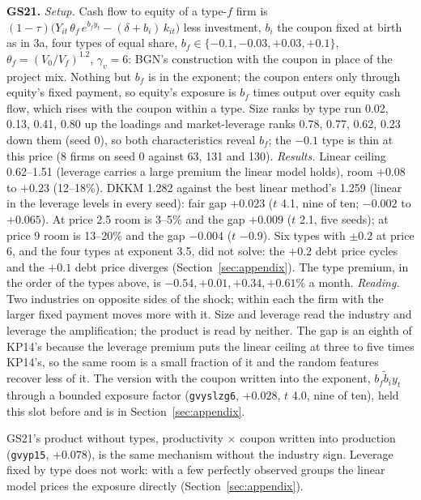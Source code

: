 \documentclass[11pt]{article}
\begin{document}
\noindent\textbf{GS21.} \emph{Setup.} Cash flow to equity of a type-$f$ firm is $(1-\tau)\big(Y_{it}\,\theta_f\,e^{b_f y_t} - (\delta + b_i)\,k_{it}\big)$ less investment, $b_i$ the coupon fixed at birth as in 3a, four types of equal share, $b_f \in \{-0.1, -0.03, +0.03, +0.1\}$, $\theta_f = (V_0/V_f)^{1.2}$, $\gamma_v = 6$: BGN's construction with the coupon in place of the project mix. Nothing but $b_f$ is in the exponent; the coupon enters only through equity's fixed payment, so equity's exposure is $b_f$ times output over equity cash flow, which rises with the coupon within a type. Size ranks by type run 0.02, 0.13, 0.41, 0.80 up the loadings and market-leverage ranks 0.78, 0.77, 0.62, 0.23 down them (seed 0), so both characteristics reveal $b_f$; the $-0.1$ type is thin at this price (8 firms on seed 0 against 63, 131 and 130). \emph{Results.} Linear ceiling 0.62--1.51 (leverage carries a large premium the linear model holds), room $+0.08$ to $+0.23$ (12--18\%). DKKM 1.282 against the best linear method's 1.259 (linear in the leverage levels in every seed): fair gap $+0.023$ ($t$ 4.1, nine of ten; $-0.002$ to $+0.065$). At price 2.5 room is 3--5\% and the gap $+0.009$ ($t$ 2.1, five seeds); at price 9 room is 13--20\% and the gap $-0.004$ ($t$ $-0.9$). Six types with $\pm 0.2$ at price 6, and the four types at exponent 3.5, did not solve: the $+0.2$ debt price cycles and the $+0.1$ debt price diverges (Section~\ref{sec:appendix}). The type premium, in the order of the types above, is $-0.54, +0.01, +0.34, +0.61$\% a month. \emph{Reading.} Two industries on opposite sides of the shock; within each the firm with the larger fixed payment moves more with it. Size and leverage read the industry and leverage the amplification; the product is read by neither. The gap is an eighth of KP14's because the leverage premium puts the linear ceiling at three to five times KP14's, so the same room is a small fraction of it and the random features recover less of it. The version with the coupon written into the exponent, $b_f \tilde b_i y_t$ through a bounded exposure factor (\texttt{gvyslzg6}, $+0.028$, $t$ 4.0, nine of ten), held this slot before and is in Section~\ref{sec:appendix}.

\noindent GS21's product without types, productivity $\times$ coupon written into production (\texttt{gvyp15}, $+0.078$), is the same mechanism without the industry sign. Leverage fixed by type does not work: with a few perfectly observed groups the linear model prices the exposure directly (Section~\ref{sec:appendix}).
\end{document}
